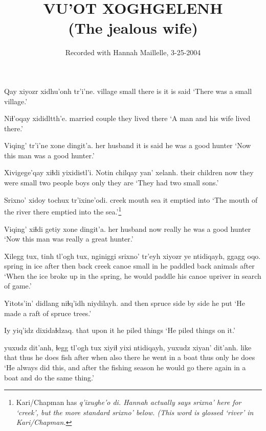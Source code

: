 \documentclass[12pt]{article}
\begin{document}
\title{VU'OT XOGHGELENH 
\\(The jealous wife)}

\author{Recorded with Hannah Maillelle, 3-25-2004}
\date{}

\maketitle

\gll Qay xiyozr xidhu'onh tr'i'ne.
village small {there is} {it is said}
\glt `There was a small village.'
\glend

\gll Niɬ'oqay  xididltth'e.
{married couple} {they lived there}
\glt `A man and his wife lived there.'
\glend 

\gll Viqing' tr'i'ne {xone dingit'a.}
{her husband} {it is said} {he was a good hunter}
\glt `Now this man was a good hunter.'
\glend 

\gll Xivigege'qay  xiɬdi yixidistl'i. Notin chilqay yan' xelanh.
{their children}  now {they were small} {two people} boys only {they are}
\glt `They had two small sons.'
\glend 

\gll Srixno' xidoy tochux {tr'ixine'odi.}
creek  mouth  sea  {it emptied into}
\glt `The mouth of the river there emptied into the sea.'\footnote{Kari/Chapman has \em q'ixughe'o di. \em Hannah actually says \em srixna' \em here for `creek', but the more standard \em srixno' \em below. (This word is glossed `river' in Kari/Chapman.}
\glend 

\gll Viqing' xiɬdi getiy {xone dingit'a.}
{her husband} now really {he was a good hunter}
\glt `Now this man was really a great hunter.'
\glend 

\gll Xilegg tux, tinh tl'ogh tux, nginiggi srixno' tr'eyh xiyozr ye ntidiqayh, ggagg oqo.
spring in ice after then back  creek  canoe small  in {he paddled back} animals after
\glt `When the ice broke up in the spring, he would paddle his canoe upriver in search of game.'
\glend 

\gll Yitots'in' didlang niɬq'idh niydilayh. 
{and then} spruce {side by side} {he put} 
\glt `He made a raft of spruce trees.'
\glend 

\gll Iy yiq'idz dixidaɬdzaq.
that {upon it} {he piled things}
\glt `He piled things on it.'
\glend

 yuxudz dit'anh, ɬegg tl'ogh tux xiyiɬ yixi ntidiqayh, yuxudz xiyan' dit'anh.
{like that}  thus  {he does} fish after when also there {he went in a boat} thus  only  {he does}
\glt `He always did this, and after the fishing season he would go there again in a boat and do the same thing.'
\glend 
\end{document}
